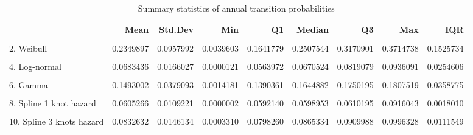 \documentclass[]{article}
\begin{document}
\begin{table}
\caption{\label{tab:validate_extrapolation1}Summary statistics of annual transition probabilities}
\begin{tabular}[t]{lrrrrrrrr}
\toprule
  & Mean & Std.Dev & Min & Q1 & Median & Q3 & Max & IQR\\
\midrule
\cellcolor{gray!6}{1. Exponential} & \cellcolor{gray!6}{0.0585969} & \cellcolor{gray!6}{0.0000000} & \cellcolor{gray!6}{0.0585969} & \cellcolor{gray!6}{0.0585969} & \cellcolor{gray!6}{0.0585969} & \cellcolor{gray!6}{0.0585969} & \cellcolor{gray!6}{0.0585969} & \cellcolor{gray!6}{0.0000000}\\
2. Weibull & 0.2349897 & 0.0957992 & 0.0039603 & 0.1641779 & 0.2507544 & 0.3170901 & 0.3714738 & 0.1525734\\
\cellcolor{gray!6}{3. Gompertz} & \cellcolor{gray!6}{0.4784514} & \cellcolor{gray!6}{0.3579470} & \cellcolor{gray!6}{0.0342601} & \cellcolor{gray!6}{0.1256322} & \cellcolor{gray!6}{0.4037134} & \cellcolor{gray!6}{0.8634656} & \cellcolor{gray!6}{1.0000000} & \cellcolor{gray!6}{0.7378334}\\
4. Log-normal & 0.0683436 & 0.0166027 & 0.0000121 & 0.0563972 & 0.0670524 & 0.0819079 & 0.0936091 & 0.0254606\\
\cellcolor{gray!6}{5. Log-logistic} & \cellcolor{gray!6}{0.0728032} & \cellcolor{gray!6}{0.0230017} & \cellcolor{gray!6}{0.0022936} & \cellcolor{gray!6}{0.0533146} & \cellcolor{gray!6}{0.0700441} & \cellcolor{gray!6}{0.0935993} & \cellcolor{gray!6}{0.1092616} & \cellcolor{gray!6}{0.0401882}\\
6. Gamma & 0.1493002 & 0.0379093 & 0.0014181 & 0.1390361 & 0.1644882 & 0.1750195 & 0.1807519 & 0.0358775\\
\cellcolor{gray!6}{7. Generalised Gamma} & \cellcolor{gray!6}{0.0347149} & \cellcolor{gray!6}{0.0206128} & \cellcolor{gray!6}{0.0000000} & \cellcolor{gray!6}{0.0191123} & \cellcolor{gray!6}{0.0269247} & \cellcolor{gray!6}{0.0452063} & \cellcolor{gray!6}{0.0862100} & \cellcolor{gray!6}{0.0260182}\\
8. Spline 1 knot hazard & 0.0605266 & 0.0109221 & 0.0000002 & 0.0592140 & 0.0598953 & 0.0610195 & 0.0916043 & 0.0018010\\
\cellcolor{gray!6}{9. Spline 2 knots hazard} & \cellcolor{gray!6}{0.0593803} & \cellcolor{gray!6}{0.0110234} & \cellcolor{gray!6}{0.0000002} & \cellcolor{gray!6}{0.0576502} & \cellcolor{gray!6}{0.0585313} & \cellcolor{gray!6}{0.0599923} & \cellcolor{gray!6}{0.0923962} & \cellcolor{gray!6}{0.0023363}\\
10. Spline 3 knots hazard & 0.0832632 & 0.0146134 & 0.0003310 & 0.0798260 & 0.0865334 & 0.0909988 & 0.0996328 & 0.0111549\\

\end{tabular}
\end{table}
\end{document}
